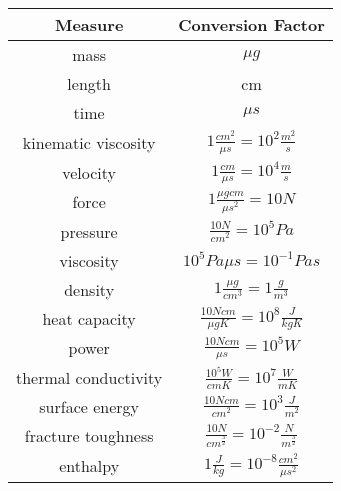 \begin{tabular}{|c|c|}
\hline
\bf{Measure} & \bf{Conversion Factor}     \\
\hline
mass	& $\mu g$               \\
length  & cm                    \\
time    & $\mu s$               \\ [1ex]
kinematic viscosity & $1\frac{\displaystyle cm^2}{\displaystyle \mu s} = 10^2 \frac{\displaystyle m^2}{\displaystyle s}$                          \\ [1ex]
velocity            & $1\frac{\displaystyle cm}{\displaystyle \mu s} = 10^4 \frac{\displaystyle m}{\displaystyle s}$                              \\ [2ex]
force               & $1\frac{\displaystyle \mu gcm}{\displaystyle \mu s^2} = 10 N$                                                               \\ [2ex]
pressure            & $\frac{\displaystyle 10 N}{\displaystyle cm^2} = 10^5 Pa$                                                                   \\ [1ex]
viscosity           & $10^5 Pa \mu s = 10^{-1} Pa s$                                                                                              \\ [1ex]
density             & $1\frac{\displaystyle \mu g}{\displaystyle cm^3} = 1\frac{\displaystyle g}{\displaystyle m^3}$                              \\ [1ex]
heat capacity       & $\frac{\displaystyle 10N cm}{\displaystyle \mu g K} = 10^8 \frac{\displaystyle J}{\displaystyle kg K}$                      \\ [2ex]
power               & $\frac{\displaystyle 10N cm}{\displaystyle \mu s} = 10^5 W$                                                                 \\ [1ex]
thermal conductivity& $\frac{\displaystyle 10^5 W}{\displaystyle cm K} = 10^7 \frac{\displaystyle W}{\displaystyle m K}$                          \\ [2ex]
surface energy      & $\frac{\displaystyle 10 N cm}{\displaystyle cm^2} = 10^3 \frac{\displaystyle J}{\displaystyle m^2}$                         \\ [2ex]
fracture toughness  & $\frac{\displaystyle 10 N}{\displaystyle cm^{\frac{3}{2}}} = 10^{-2} \frac{\displaystyle N}{\displaystyle m^{\frac{3}{2}}}$ \\ [2ex]
enthalpy            & $1\frac{\displaystyle J}{\displaystyle kg} = 10^{-8} \frac{\displaystyle cm^2}{\displaystyle \mu s^2}$                      \\ [2ex]
\hline
\end{tabular}


